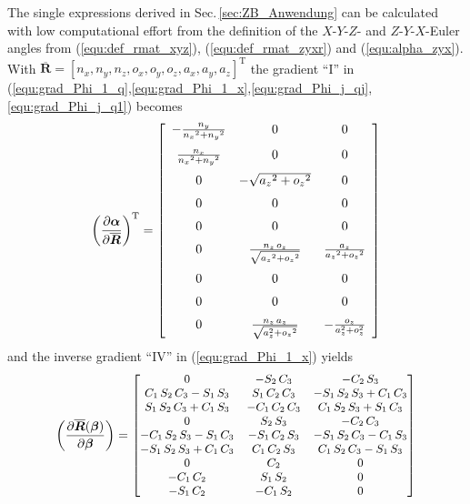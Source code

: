 \documentclass[robotics,article,submit,moreauthors,pdftex]{Definitions/mdpi}
\newcommand{\bm}[1]{\boldsymbol{#1}}
\newcommand{\transp}[0]{{\mathrm{T}}}
\begin{document}
The single expressions derived in Sec.\,\ref{sec:ZB_Anwendung} can be calculated with low computational effort from the definition of the $X$-$Y$-$Z$- and $Z$-$Y$-$X$-Euler angles from (\ref{equ:def_rmat_xyz}), (\ref{equ:def_rmat_zyxr}) and (\ref{equ:alpha_zyx}).
With $\overline{\bm{R}}=[n_x,n_y,n_z ,o_x,o_y,o_z,a_x,a_y,a_z]^\transp$ the gradient ``I'' in (\ref{equ:grad_Phi_1_q},\ref{equ:grad_Phi_1_x},\ref{equ:grad_Phi_j_qj},\ref{equ:grad_Phi_j_q1}) becomes
\begin{equation}
\left(\frac{\partial \bm{\alpha}}{\partial \overline{\bm{R}}}\right)^\transp
=
\left[ \begin {array}{ccc} -{\frac {{n_y}}{{{n_x}}^{2}+{{n_y }}^{2}}}&0&0\\ \noalign{\medskip}{\frac {{n_x}}{{{n_x}}^{2}+{{ n_y}}^{2}}}&0&0\\ \noalign{\medskip}0&-\sqrt {{{a_z}}^{2}+{{ o_z}}^{2}}&0\\ \noalign{\medskip}0&0&0\\ \noalign{\medskip}0&0&0 \\ \noalign{\medskip}0&{\frac {{n_z}\,{o_z}}{\sqrt {{{a_z}}^{ 2}+{{o_z}}^{2}}}}&{\frac {{a_z}}{{{a_z}}^{2}+{{o_z}}^{2}}} \\ \noalign{\medskip}0&0&0\\ \noalign{\medskip}0&0&0 \\ \noalign{\medskip}0&{\frac {{n_z}\,{a_z}}{\sqrt {a_z^{2}+{{o_z}}^{2}}}}&-{\frac {o_z}{a_z^{2}+o_z^{2}} }\end {array} \right] 
\label{equ:alpha_xyz_diff_R}
\end{equation}
%
and the inverse gradient ``IV'' in (\ref{equ:grad_Phi_1_x}) yields
%
\begin{align}
\left(\frac{\partial \overline{\bm{R}}(\bm{\beta})}{\partial \bm{\beta}}\right)
=
\small
\begin{bmatrix}
    0&-{ S_2}\,{ C_3}&-{ C_2}\,{ S_3}
    \\ { C_1}\,{ S_2}\,{ C_3}-{ S_1}\,{ S_3}&{
        S_1}\,{ C_2}\,{ C_3}&-{ S_1}\,{ S_2}\,{ S_3}+{ C_1}\,{
        C_3}\\ { S_1}\,{ S_2}\,{ C_3}+{ C_1}\,{
        S_3}&-{ C_1}\,{ C_2}\,{ C_3}&{ C_1}\,{ S_2}\,{ S_3}+{
        S_1}\,{ C_3}\\ 0&{ S_2}\,{ S_3}&-{ C_2}\,
    { C_3}\\ -{ C_1}\,{ S_2}\,{ S_3}-{ S_1}\,{
        C_3}&-{ S_1}\,{ C_2}\,{ S_3}&-{ S_1}\,{ S_2}\,{ C_3}-{
        C_1}\,{ S_3}\\ -{ S_1}\,{ S_2}\,{ S_3}+{
        C_1}\,{ C_3}&{ C_1}\,{ C_2}\,{ S_3}&{ C_1}\,{ S_2}\,{
        C_3}-{ S_1}\,{ S_3}\\ 0&{ C_2}&0
    \\ -{ C_1}\,{ C_2}&{ S_1}\,{ S_2}&0
    \\ -{ S_1}\,{ C_2}&-{ C_1}\,{ S_2}&0
    \end {bmatrix}
\label{equ:rotmat_diff_beta}
\end{align}
\end{document}
